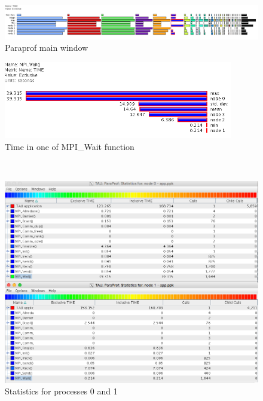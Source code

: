 \documentclass[10pt,twoside]{article}   	%
\begin{document}
\begin{figure}[H]
\includegraphics[width=18cm]{IMAGES/ScreenShot2bis}
\caption{Paraprof main window }
\label{fig:2}
\end{figure}

\begin{figure}[H]
\centering
\includegraphics[width=10cm]{IMAGES/ScreenShotWait}
\caption{Time in one of MPI\_Wait function}
\label{fig:wait}
\end{figure}

 \\

\begin{figure}[H]
\includegraphics[width=18cm]{IMAGES/ScreenShot5}
\caption{Statistics for processes 0 and 1}
\label{fig:5}
\end{figure}

 \\
\end{document}
